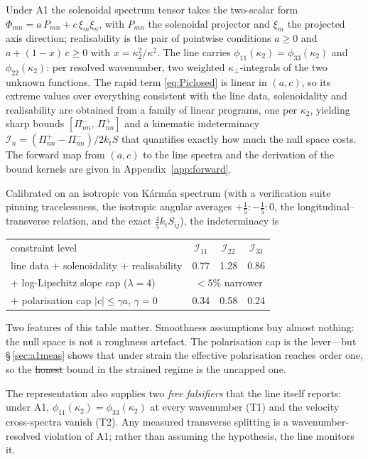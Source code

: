\documentclass[lineno]{JFM-FLM_Au}
\newcounter{assumption}
\providecommand{\DIFadd}[1]{{\protect\color{blue}\uwave{#1}}} %
\providecommand{\DIFdel}[1]{{\protect\color{red}\sout{#1}}} %
\providecommand{\DIFaddbegin}{} %
\providecommand{\DIFaddend}{} %
\providecommand{\DIFdelbegin}{} %
\providecommand{\DIFdelend}{} %
\begin{document}
Under A1 the solenoidal spectrum tensor takes the two-scalar form
$\Phi_{mn}=a\,P_{mn}+c\,\xi_m\xi_n$, with $P_{mn}$ the solenoidal projector
and $\xi_m$ the projected axis direction; realisability is the pair of
pointwise conditions $a\ge0$ and $a+(1-x)\,c\ge0$ with
$x=\kappa_2^2/\kappa^2$. The line carries $\phi_{11}(\kappa_2)
=\phi_{33}(\kappa_2)$ and $\phi_{22}(\kappa_2)$: per resolved wavenumber,
two weighted $\kappa_\perp$-integrals of the two unknown functions. The
rapid term \eqref{eq:Piclosed} is linear in $(a,c)$, so its extreme values
over everything consistent with the line data, solenoidality and
realisability are obtained from a family of linear programs, one per
$\kappa_2$, yielding sharp bounds
$[\Pi^{-}_{nn},\,\Pi^{+}_{nn}]$ and a kinematic indeterminacy
$\mathcal I_n=(\Pi^{+}_{nn}-\Pi^{-}_{nn})/2k_tS$ that quantifies exactly
how much the null space costs. The forward map from $(a,c)$ to the line
spectra and the derivation of the bound kernels are given in
Appendix~\ref{app:forward}.

Calibrated on an isotropic von K\'arm\'an spectrum (with a verification
suite pinning tracelessness, the isotropic angular averages
$+\tfrac15:-\tfrac15:0$, the longitudinal--transverse relation, and the
exact $\tfrac45 k_t S_{ij}$), the indeterminacy is
\begin{center}\small
\begin{tabular}{lccc}
constraint level & $\mathcal I_{11}$ & $\mathcal I_{22}$ & $\mathcal I_{33}$\\[1pt]
line data $+$ solenoidality $+$ realisability & 0.77 & 1.28 & 0.86\\
$+$ log-Lipschitz slope cap ($\lambda=4$) & \multicolumn{3}{c}{$<5\%$ narrower}\\
$+$ polarisation cap $|c|\le\gamma a$, $\gamma=0$ & 0.34 & 0.58 & 0.24\\
\end{tabular}
\end{center}
Two features of this table matter. Smoothness assumptions buy almost
nothing: the null space is not a roughness artefact. The polarisation cap
is the lever---but \S\,\ref{sec:a1meas} shows that under strain the
effective polarisation reaches order one, so the \DIFdelbegin \DIFdel{honest }\DIFdelend \DIFaddbegin \DIFadd{applicable }\DIFaddend bound in the strained regime is the uncapped one.

The representation also supplies two \emph{free falsifiers} that the line
itself reports: under A1, $\phi_{11}(\kappa_2)=\phi_{33}(\kappa_2)$ at
every wavenumber (T1) and the velocity cross-spectra vanish (T2). Any
measured transverse splitting is a wavenumber-resolved violation of A1;
rather than assuming the hypothesis, the line monitors it.
\end{document}

